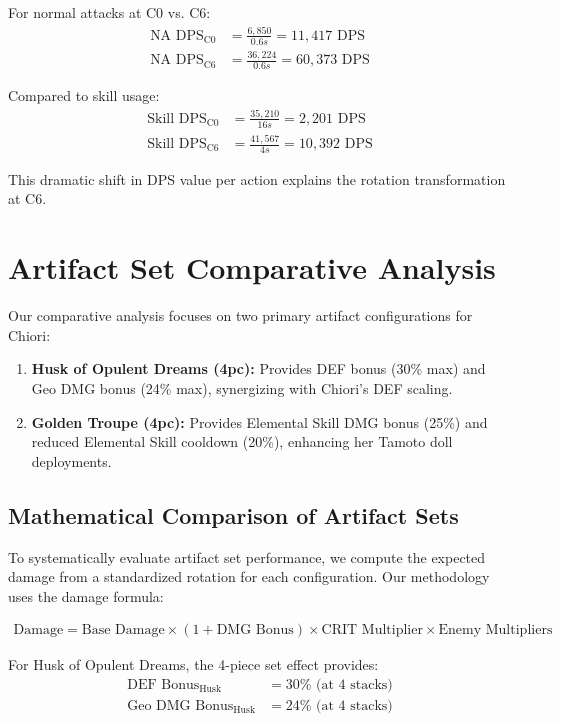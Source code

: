 \documentclass[12pt,a4paper]{article}
\begin{document}
For normal attacks at C0 vs. C6:
\begin{align}
\text{NA DPS}_{\text{C0}} &= \frac{6,850}{0.6s} = 11,417 \text{ DPS} \\
\text{NA DPS}_{\text{C6}} &= \frac{36,224}{0.6s} = 60,373 \text{ DPS}
\end{align}

Compared to skill usage:
\begin{align}
\text{Skill DPS}_{\text{C0}} &= \frac{35,210}{16s} = 2,201 \text{ DPS} \\
\text{Skill DPS}_{\text{C6}} &= \frac{41,567}{4s} = 10,392 \text{ DPS}
\end{align}

This dramatic shift in DPS value per action explains the rotation transformation at C6.

\section{Artifact Set Comparative Analysis}

Our comparative analysis focuses on two primary artifact configurations for Chiori:

\begin{enumerate}
    \item \textbf{Husk of Opulent Dreams (4pc):} Provides DEF bonus (30\% max) and Geo DMG bonus (24\% max), synergizing with Chiori's DEF scaling.
    \item \textbf{Golden Troupe (4pc):} Provides Elemental Skill DMG bonus (25\%) and reduced Elemental Skill cooldown (20\%), enhancing her Tamoto doll deployments.
\end{enumerate}

\subsection{Mathematical Comparison of Artifact Sets}

To systematically evaluate artifact set performance, we compute the expected damage from a standardized rotation for each configuration. Our methodology uses the damage formula:

\begin{align}
\text{Damage} = \text{Base Damage} \times (1 + \text{DMG Bonus}) \times \text{CRIT Multiplier} \times \text{Enemy Multipliers}
\end{align}

For Husk of Opulent Dreams, the 4-piece set effect provides:
\begin{align}
\text{DEF Bonus}_{\text{Husk}} &= 30\% \text{ (at 4 stacks)} \\
\text{Geo DMG Bonus}_{\text{Husk}} &= 24\% \text{ (at 4 stacks)}
\end{align}
\end{document}
